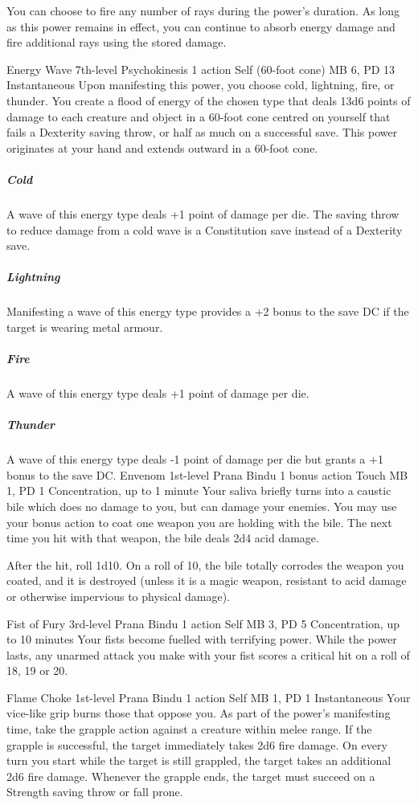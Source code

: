 You can choose to fire any number of rays during the power's
duration. As long as this power remains in effect, you can
continue to absorb energy damage and fire additional rays
using the stored damage.

\DndPowerHeader%
    {Energy Wave\label{pwr:energy_wave}}
    {7th-level Psychokinesis}
    {1 action}
    {Self (60-foot cone)}
    {MB 6, PD 13}
    {Instantaneous}
Upon manifesting this power,
you choose cold, lightning, fire, or thunder.
You create a flood of energy of the chosen type
that deals 13d6 points of damage
to each creature and object in a 60-foot cone
centred on yourself
that fails a Dexterity saving throw,
or half as much on a successful save.
This power originates at your hand
and extends outward in a 60-foot cone.
\subparagraph{Cold}
A wave of this energy type deals +1 point
of damage per die.
The saving throw to reduce damage from a cold wave
is a Constitution save instead of a Dexterity save.  
\subparagraph{Lightning}
Manifesting a wave of this energy type
provides a +2 bonus to the save DC if the target is wearing
metal armour.
\subparagraph{Fire}
A wave of this energy type deals +1 point of damage per die.
\subparagraph{Thunder}
A wave of this energy type deals -1 point of damage per die
but grants a +1 bonus to the save DC.
\DndPowerHeader%
    {Envenom\label{pwr:envenom}}
    {1st-level Prana Bindu}
    {1 bonus action}
    {Touch}
    {MB 1, PD 1}
    {Concentration, up to 1 minute}
Your saliva briefly turns into a caustic
bile which does no damage to you, but can damage your enemies.
You may use your bonus action to coat one weapon you are holding
with the bile. The next time you hit with that weapon, the
bile deals 2d4 acid damage.

After the hit, roll 1d10. On a roll of 10, the bile totally
corrodes the weapon you coated, and it is destroyed (unless
it is a magic weapon, resistant to acid damage or otherwise
impervious to physical damage).

\DndPowerHeader%
    {Fist of Fury\label{pwr:fist_of_fury}}
    {3rd-level Prana Bindu}
    {1 action}
    {Self}
    {MB 3, PD 5}
    {Concentration, up to 10 minutes}
Your fists become fuelled with terrifying
power. While the power lasts, any unarmed attack you make
with your fist scores a critical hit on a roll of 18, 19 or
20.

\DndPowerHeader%
    {Flame Choke\label{pwr:flame_choke}}
    {1st-level Prana Bindu}
    {1 action}
    {Self}
    {MB 1, PD 1}
    {Instantaneous}
Your vice-like grip burns those that oppose
you. As part of the power's manifesting time, take the grapple
action against a creature within melee range. If the grapple
is successful, the target immediately takes 2d6 fire damage.
On every turn you start while the target is still grappled,
the target takes an additional 2d6 fire damage. Whenever the
grapple ends, the target must succeed on a Strength saving
throw or fall prone.

